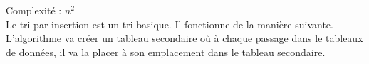\label{InsertionSort}
\footnotesize 
\noindent
Complexité :  $ n^2$
\\
\normalsize
Le tri par insertion est un tri basique. Il fonctionne de la manière suivante. L'algorithme va créer un tableau secondaire où à chaque passage dans le tableaux de données, il va la placer à son emplacement dans le tableau secondaire.